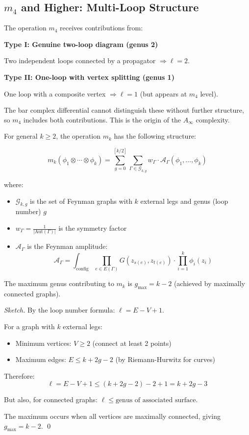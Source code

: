 \subsection{$m_4$ and Higher: Multi-Loop Structure}

\begin{example}
\label{ex:m4-two-loop}
The operation $m_4$ receives contributions from:

\textbf{Type I: Genuine two-loop diagram (genus 2)}

Two independent loops connected by a propagator $\Rightarrow \ell = 2$.

\textbf{Type II: One-loop with vertex splitting (genus 1)}

One loop with a composite vertex $\Rightarrow \ell = 1$ (but appears at $m_4$ level).

The bar complex differential cannot distinguish these without further structure, so 
$m_4$ includes both contributions. This is the origin of the $A_\infty$ complexity.
\end{example}

\begin{theorem}
\label{thm:mk-general-structure}
For general $k \geq 2$, the operation $m_k$ has the following structure:

$$m_k(\phi_1 \otimes \cdots \otimes \phi_k) = \sum_{g=0}^{[k/2]} 
\sum_{\Gamma \in \mathcal{G}_{k,g}} w_\Gamma \cdot \mathcal{A}_\Gamma(\phi_1,\ldots,\phi_k)$$

where:
\begin{itemize}
\item $\mathcal{G}_{k,g}$ is the set of Feynman graphs with $k$ external legs and 
genus (loop number) $g$
\item $w_\Gamma = \frac{1}{|\text{Aut}(\Gamma)|}$ is the symmetry factor
\item $\mathcal{A}_\Gamma$ is the Feynman amplitude:
$$\mathcal{A}_\Gamma = \int_{\text{config}} \prod_{e \in E(\Gamma)} G(z_{s(e)}, 
z_{t(e)}) \cdot \prod_{i=1}^k \phi_i(z_i)$$
\end{itemize}

The maximum genus contributing to $m_k$ is $g_{\max} = k-2$ (achieved by maximally 
connected graphs).
\end{theorem}

\begin{proof}[Sketch]
By the loop number formula: $\ell = E - V + 1$.

For a graph with $k$ external legs:
\begin{itemize}
\item Minimum vertices: $V \geq 2$ (connect at least 2 points)
\item Maximum edges: $E \leq k + 2g - 2$ (by Riemann-Hurwitz for curves)
\end{itemize}

Therefore:
$$\ell = E - V + 1 \leq (k + 2g - 2) - 2 + 1 = k + 2g - 3$$

But also, for connected graphs: $\ell \leq \text{genus of associated surface}$.

The maximum occurs when all vertices are maximally connected, giving $g_{\max} = k-2$.
\qed
\end{proof}

